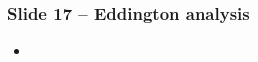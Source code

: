 \documentclass{beamer}
\begin{document}
\begin{frame}
 \frametitle{Slide 17 -- Eddington analysis}
 \begin{itemize}
   \item
 \end{itemize}
\end{frame}
\end{document}
